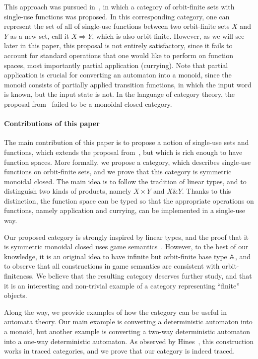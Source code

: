 This approach was pursued in~\cite{stefanski-phd}, in which a category of orbit-finite sets with single-use functions was proposed. In this corresponding category,  one can represent the set of all of single-use functions between two orbit-finite sets $X$ and $Y$ as a new set, call it $X \Rightarrow Y$, which is  also orbit-finite.  However, as we will see later in this paper, this proposal is not entirely satisfactory, since it fails to account for standard operations that one would like to perform on function spaces, most importantly partial application (currying). Note that partial application is crucial for converting an automaton into a monoid, since the monoid consists of partially applied transition functions, in which the input word is known, but the input state is not. In the language of category theory, the proposal from~\cite{stefanski-phd} failed to be a monoidal closed category. 

\paragraph*{Contributions of this paper}

The main contribution of this paper is to propose a notion of single-use sets and functions, which extends the proposal from~\cite{stefanski-phd}, but which is rich enough to have function spaces. More formally, we propose a category, which describes single-use functions on orbit-finite sets, and we prove that this category is symmetric monoidal closed. 
The main idea is to follow the tradition of linear types, and to  distinguish two kinds of products, namely $X \times Y$ and $X \& Y$. Thanks to this distinction, the function space can be typed so that the appropriate operations on functions, namely application and currying, can be implemented in a single-use way. 

Our proposed category is strongly inspired by linear types, and the proof that it is symmetric monoidal closed uses game semantics~\cite{abramsky2013semantics}. However, to the best of our knowledge, it is an original idea to have infinite but orbit-finite base type $\mathbb A$, and to observe that all constructions in game semantics are consistent with orbit-finiteness. We believe that the resulting category deserves further study, and that it is an interesting and non-trivial example of a category representing ``finite'' objects.

Along the way, we provide examples of how the category can be useful in automata theory. Our main example is converting a deterministic automaton into a monoid, but another example is converting a two-way deterministic automaton into a one-way deterministic automaton. As observed by Hines~\cite[Section 4]{hines2003categorical}, this construction works in traced categories, and we prove that our category is indeed traced. 

